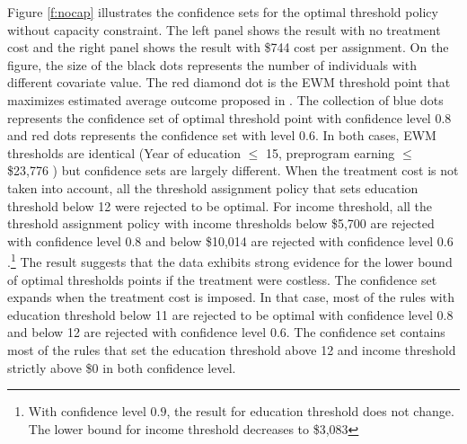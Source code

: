 \documentclass[12pt,oneside,reqno,english]{amsart}
\theoremstyle{definition}
\begin{document}
Figure \ref{f:nocap} illustrates the confidence sets for the optimal threshold policy without capacity constraint. 
The left panel shows the result with no treatment cost and the right panel shows the result with \$744 cost per assignment. 
On the figure, the size of the black dots represents the number of individuals with different covariate value. The red diamond dot is the EWM threshold point that maximizes estimated average outcome proposed in \cite{KT:18}.  The collection of blue dots represents the confidence set of optimal threshold point 
with confidence level $0.8$ and red dots represents the confidence set with level $0.6$. 
In both cases, EWM thresholds are identical (Year of education $\leq$ 15, preprogram earning $\leq$ \$23,776 ) but confidence sets are largely different. 
When the treatment cost is not taken into account, all the threshold assignment policy that sets education threshold below 12 were rejected to be optimal.
For income threshold, all the threshold assignment policy with income thresholds below \$5,700 are rejected with confidence level $0.8$ and below \$10,014 are rejected 
with confidence level $0.6$.\footnote{With confidence level $0.9$, the result for education threshold does not change. The lower bound for income threshold decreases to \$3,083} The result suggests that the data exhibits strong evidence for the lower bound of optimal thresholds points if the treatment were costless.  
The confidence set expands when the treatment cost is imposed. In that case, most of the rules with education threshold below 11 are rejected to be optimal with confidence level $0.8$ and below 12 are rejected with confidence level $0.6$.  
The confidence set contains most of the rules that set the education threshold above 12 and income threshold strictly above \$0 in both confidence level. 
\end{document}
